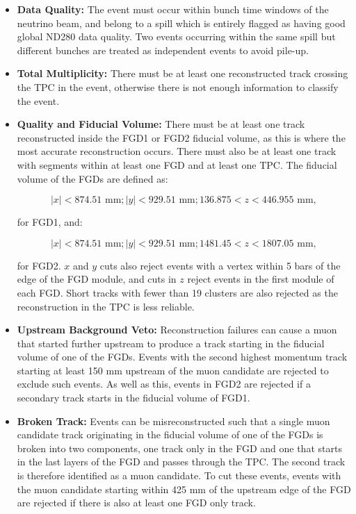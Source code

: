\begin{itemize}

\item \textbf{Data Quality:} The event must occur within bunch time windows of the neutrino beam, and belong to a spill which is entirely flagged as having good global ND280 data quality. Two events occurring within the same spill but different bunches are treated as independent events to avoid pile-up.

\item \textbf{Total Multiplicity:} There must be at least one reconstructed track crossing the TPC in the event, otherwise there is not enough information to classify the event.

\item \textbf{Quality and Fiducial Volume:} There must be at least one track reconstructed inside the FGD1 or FGD2 fiducial volume, as this is where the most accurate reconstruction occurs. There must also be at least one track with segments within at least one FGD and at least one TPC. The fiducial volume of the FGDs are defined as:

\begin{equation}
|x| < 874.51 \textrm{ mm}; |y| < 929.51 \textrm{ mm}; 136.875 < z < 446.955 \textrm{ mm},
\end{equation}

for FGD1, and:

\begin{equation}
|x| < 874.51 \textrm{ mm}; |y| < 929.51 \textrm{ mm}; 1481.45 < z < 1807.05 \textrm{ mm},
\end{equation}

for FGD2. $x$ and $y$ cuts also reject events with a vertex within 5 bars of the edge of the FGD module, and cuts in $z$ reject events in the first module of each FGD. Short tracks with fewer than 19 clusters are also rejected as the reconstruction in the TPC is less reliable.

\item \textbf{Upstream Background Veto:} Reconstruction failures can cause a muon that started further upstream to produce a track starting in the fiducial volume of one of the FGDs. Events with the second highest momentum track starting at least 150 mm upstream of the muon candidate are rejected to exclude such events. As well as this, events in FGD2 are rejected if a secondary track starts in the fiducial volume of FGD1.

\item \textbf{Broken Track:} Events can be misreconstructed such that a single muon candidate track originating in the fiducial volume of one of the FGDs is broken into two components, one track only in the FGD and one that starts in the last layers of the FGD and passes through the TPC. The second track is therefore identified as a muon candidate. To cut these events, events with the muon candidate starting within 425 mm of the upstream edge of the FGD are rejected if there is also at least one FGD only track.


\end{itemize}
